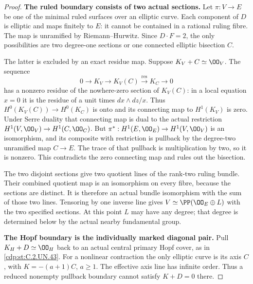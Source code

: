 \begin{proof}
\par\medskip\noindent\textbf{The ruled boundary consists of two actual sections.}
Let $\pi:V\to E$ be one of the minimal ruled
surfaces over an elliptic curve. Each component
of $D$ is elliptic and maps finitely to $E$:
it cannot be contained in a rational ruling
fibre. The map is unramified by
Riemann--Hurwitz. Since $D\cdot F=2$, the
only possibilities are two degree-one
sections or one connected elliptic
bisection $C$.

The latter is excluded by an exact residue
map. Suppose $K_V+C\simeq\OO_V$.
The sequence
\[
 0\longrightarrow K_V\longrightarrow K_V(C)
      \xrightarrow{\operatorname{res}}K_C\longrightarrow0
\tag{C.CZ.10}\label{cdp:eq:C.CZ.10}
\]
has a nonzero residue of the nowhere-zero
section of $K_V(C)$: in a local equation
$x=0$ it is the residue of a unit times
$dx\wedge dz/x$. Thus
$H^0(K_V(C))\to H^0(K_C)$ is onto and
its connecting map to $H^1(K_V)$ is zero.
Under Serre duality that connecting map
is dual to the actual restriction
$H^1(V,\OO_V)\to H^1(C,\OO_C)$.
But $\pi^*:H^1(E,\OO_E)\to H^1(V,\OO_V)$
is an isomorphism, and its composite with
restriction is pullback by the degree-two
unramified map $C\to E$. The trace of
that pullback is multiplication by two,
so it is nonzero. This contradicts the
zero connecting map and rules out the
bisection.

The two disjoint sections give two
quotient lines of the rank-two ruling
bundle. Their combined quotient map is
an isomorphism on every fibre, because
the sections are distinct. It is therefore
an actual bundle isomorphism with the
sum of those two lines. Tensoring by
one inverse line gives
$V\simeq\PP(\OO_E\oplus L)$ with the
two specified sections. At this point
$L$ may have any degree; that degree
is determined below by the actual
nearby fundamental group.

\par\medskip\noindent\textbf{The Hopf boundary is the individually marked diagonal pair.}
Pull $K_H+D\simeq\OO_H$ back to an actual
central primary Hopf cover, as in \ref{cdp:st:C.2.UN.43}.
For a nonlinear contraction the only
elliptic curve is its axis $C$, with
$K=-(a+1)C$, $a\ge1$. The effective
axis line has infinite order. Thus a
reduced nonempty pullback boundary
cannot satisfy $K+D=0$ there.


\end{proof}
